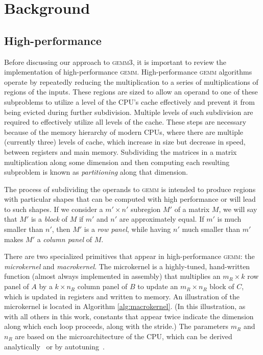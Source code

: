\documentclass[12pt]{article}
\newcommand*{\gemmt}{{\textsc{gemm3}}}
\newcommand*{\gemm}{{\textsc{gemm}}}
\newcommand*{\mycite}[1]{~\cite{#1}}
\begin{document}
\section{Background}
\subsection{High-performance {\cmunicode \gemm{}}}
Before discussing our approach to \gemmt{}, it is important to review the implementation of high-performance \gemm{}.
High-performance \gemm{} algorithms operate by repeatedly reducing the multiplication to a series of multiplications of regions of the inputs.
These regions are sized to allow an operand to one of these subproblems to utilize a level of the CPU's cache effectively and prevent it from being evicted during further subdivision.
Multiple levels of such subdivision are required to effectively utilize all levels of the cache.
These steps are necessary because of the memory hierarchy of modern CPUs, where there are multiple (currently three) levels of cache, which increase in size but decrease in speed, between registers and main memory.
Subdividing the matrices in a matrix multiplication along some dimension and then computing each resulting subproblem is known as \emph{partitioning} along that dimension.

The process of subdividing the operands to \gemm{} is intended to produce regions with particular shapes that can be computed with high performance or will lead to such shapes.
If we consider a $m' \times n'$ subregion $M'$ of a matrix $M$, we will say that $M'$ is a \emph{block} of $M$ if $m'$ and $n'$ are approximately equal.
If $m'$ is much smaller than $n'$, then $M'$ is a \emph{row panel}, while having $n'$ much smaller than $m'$ makes $M'$ a \emph{column panel} of $M$.

There are two specialized primitives that appear in high-performance \gemm{}: the \emph{microkernel} and \emph{macrokernel}.
The microkernel is a highly-tuned, hand-written function (almost always implemented in assembly) that multiplies an $m_R \times k$ row panel of $A$ by a $k \times n_R$ column panel of $B$ to update an $m_R \times n_R$ block of $C$, which is updated in registers and written to memory.
An illustration of the microkernel is located in Algorithm \ref{alg:macrokernel}.
(In this illustration, as with all others in this work, constants that appear twice indicate the dimension along which each loop proceeds, along with the stride.)
The parameters $m_R$ and $n_R$ are based on the microarchitecture of the CPU, which can be derived analytically\mycite{Low2016} or by autotuning\mycite{Whaley1998}.
\end{document}
